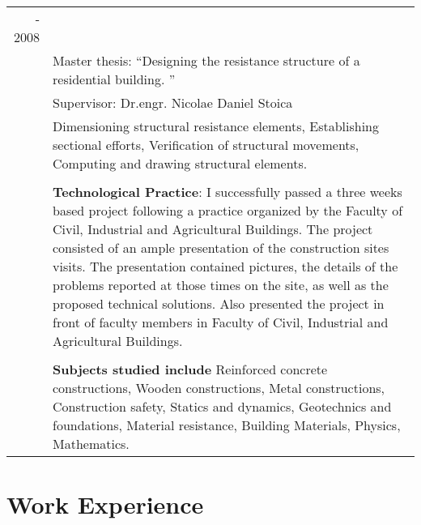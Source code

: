 \documentclass[a4paper,10pt]{article} %
\begin{document}
\begin{tabular}{r|p{15cm}}
- 2008 & \emph{} \\
& Master thesis: ``Designing the resistance structure of a residential building. ''\\
& \small Supervisor: Dr.engr. Nicolae Daniel Stoica\\
& Dimensioning structural resistance elements, Establishing sectional efforts, Verification of structural movements, Computing and drawing structural elements.\\
& \\
& \textbf{Technological Practice}: I successfully passed a three weeks based project following a practice organized by the Faculty of Civil, Industrial and Agricultural Buildings. The project consisted of an ample presentation of the construction sites visits. The presentation contained pictures, the details of the problems reported at those times on the site, as well as the proposed technical solutions. 
Also presented the project in front of faculty members in Faculty of Civil, Industrial and Agricultural Buildings.\\
& \\
& \textbf{Subjects studied include} Reinforced concrete constructions, Wooden constructions, Metal constructions, Construction safety, Statics and dynamics, Geotechnics and foundations, Material resistance, Building Materials, Physics, Mathematics.\\
\end{tabular}



\section*{Work Experience}
\end{document}
